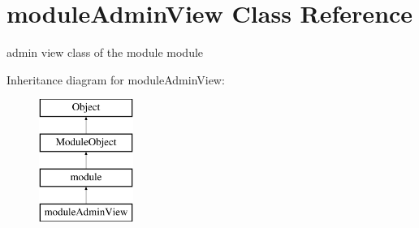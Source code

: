 \hypertarget{classmoduleAdminView}{}\section{module\+Admin\+View Class Reference}
\label{classmoduleAdminView}


admin view class of the module module  


Inheritance diagram for module\+Admin\+View\+:\begin{figure}[H]
\begin{center}
\leavevmode
\includegraphics[height=4.000000cm]{classmoduleAdminView}
\end{center}
\end{figure}
